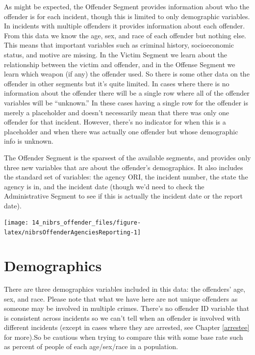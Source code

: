 \documentclass[
]{krantz}
\let\origfigure\figure
\let\endorigfigure\endfigure
\renewenvironment{figure}[1][2] {
    \expandafter\origfigure\expandafter[H]
} {
    \endorigfigure
}
\begin{document}
As might be expected, the Offender Segment provides
information about who the offender is for each incident,
though this is limited to only demographic variables. In
incidents with multiple offenders it provides information
about each offender. From this data we know the age, sex,
and race of each offender but nothing else. This means that
important variables such as criminal history, socioeconomic
status, and motive are missing. In the Victim Segment we
learn about the relationship between the victim and
offender, and in the Offense Segment we learn which weapon
(if any) the offender used. So there is some other data on
the offender in other segments but it's quite limited. In
cases where there is no information about the offender there
will be a single row where all of the offender variables
will be ``unknown.'' In these cases having a single row for
the offender is merely a placeholder and doesn't necessarily
mean that there was only one offender for that incident.
However, there's no indicator for when this is a placeholder
and when there was actually one offender but whose
demographic info is unknown.

The Offender Segment is the sparsest of the available
segments, and provides only three new variables that are
about the offender's demographics. It also includes the
standard set of variables: the agency ORI, the incident
number, the state the agency is in, and the incident date
(though we'd need to check the Administrative Segment to see
if this is actually the incident date or the report date).

\begin{figure}

{\centering \texttt{[image: 14\_nibrs\_offender\_files/figure-latex/nibrsOffenderAgenciesReporting-1]} 

}

\caption{The annual number of agencies reporting data in the NIBRS Offender Segment, 1991-2022.}\label{fig:nibrsOffenderAgenciesReporting}
\end{figure}

\section{Demographics}\label{demographics-1}

There are three demographics variables included in this
data: the offenders' age, sex, and race. Please note that
what we have here are not unique offenders as someone may be
involved in multiple crimes. There's no offender ID variable
that is consistent across incidents so we can't tell when an
offender is involved with different incidents (except in
cases where they are arrested, see Chapter \ref{arrestee}
for more).So be cautious when trying to compare this with
some base rate such as percent of people of each
age/sex/race in a population.
\end{document}
